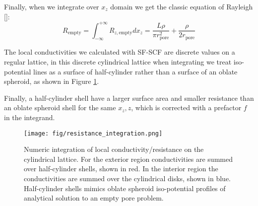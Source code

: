 \documentclass[10pt, a4paper]{article}
\newcommand\todo[1]{\textcolor{red}{#1}}
\begin{document}
\begin{multicols}{2}
Finally, when we integrate over $x_z$ domain we get the classic equation of Rayleigh []:
\begin{equation}
    \label{eq:r_empty}
    R_{\textrm{empty}} = \int_{-\infty}^{+\infty} R_{z, \textrm{empty}} dx_z
    =\frac{L \rho}{\pi r_{\textrm{pore}}^2} + \frac{\rho}{2 r_{\textrm{pore}}}
\end{equation}



The local conductivities we calculated with SF-SCF are discrete values on a regular lattice, in this discrete cylindrical lattice when integrating we treat iso-potential lines as a surface of half-cylinder rather than a surface of an oblate spheroid, as shown in Figure \ref{fig:integration_scheme}.

Finally, a half-cylinder shell have a larger surface area and smaller resistance than an oblate spheroid shell for the same $x_{z}, z$, which is corrected with a prefactor $f$ in the integrand.

\begin{figure}[H]
    \centering
    \texttt{[image: fig/resistance\_integration.png]}
    \caption{
        Numeric integration of local conductivity/resistance on the cylindrical lattice. 
        For the exterior region conductivities are summed over half-cylinder shells, shown in red.
        In the interior region the conductivities are summed over the cylindrical disks, shown in blue.
        Half-cylinder shells mimics oblate spheroid iso-potential profiles of analytical solution to an empty pore problem.
        }
    \label{fig:integration_scheme}
\end{figure}


\end{multicols}
\end{document}
